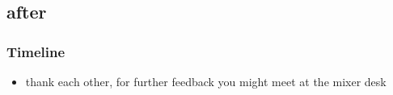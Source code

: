 \documentclass[hyperref={pdfpagelabels=false}]{beamer}
\begin{document}
\subsection{after}
\begin{frame}
\frametitle{Timeline}
\begin{itemize}
\item thank each other, for further feedback you might meet at the mixer desk
\end{itemize} 
\end{frame}

\begin{frame}
\end{frame}
\end{document}
